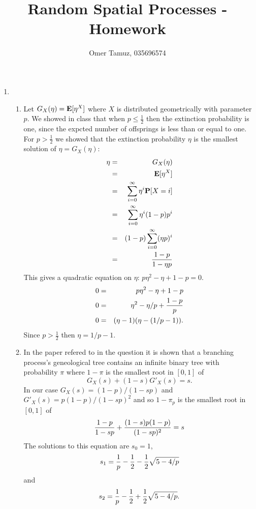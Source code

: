 \documentclass[11pt]{article} \usepackage{amssymb}
\newcommand{\E}{{\bf E}} \newcommand{\Cov}{{\bf Cov}}
\newcommand{\half}{{\textstyle \frac12}}
\begin{document}
\title{Random Spatial Processes - Homework}

 \author{Omer Tamuz, 035696574}
\maketitle


\begin{enumerate}
  \item
  \begin{enumerate}
  \item Let $G_X(\eta)=\E[\eta^X]$ where $X$ is distributed geometrically with
    parameter $p$. We showed in class that when $p \leq \half$ then the 
    extinction probability is one,
    since the expcted number of offsprings is less than or equal to one.
    For $p>\half$ we showed that the extinction probability $\eta$ is
    the smallest solution of $\eta=G_X(\eta)$:
    \begin{eqnarray*}
      \eta &=& G_X(\eta)
      \\ &=& \E[\eta^X]
      \\ &=& \sum_{i=0}^\infty \eta^i\P[X=i]
      \\ &=& \sum_{i=0}^\infty \eta^i(1-p)p^i
      \\ &=& (1-p)\sum_{i=0}^\infty (\eta p)^i
      \\ &=& {1-p \over 1 - \eta p}
    \end{eqnarray*}
    This gives a quadratic equation on $\eta$: $p\eta^2-\eta+1-p=0$.
    \begin{eqnarray*}
      0 &=& p\eta^2-\eta+1-p
      \\ 0 &=& \eta^2-\eta/p+{1-p \over p}
      \\ 0 &=& (\eta-1)(\eta-(1/p-1)).
    \end{eqnarray*}
    Since $p>\half$ then $\eta=1/p-1$.
  \item
    In the paper refered to in the question it is shown that a branching
    process's geneological tree contains an infinite binary tree with
    probability $\pi$ where $1-\pi$ is the smallest root in $[0,1]$ of
    $$G_X(s)+(1-s)G'_X(s)=s.$$
    In our case $G_X(s)=(1-p)/(1-sp)$ and $G'_X(s)=p(1-p)/(1-sp)^2$ 
    and so $1-\pi_p$ is the smallest root in $[0,1]$ of
    \begin{eqnarray*}
      {1-p \over 1-sp}+{(1-s)p(1-p)\over (1-sp)^2}=s
    \end{eqnarray*}
    The solutions to this equation are $s_0=1$,
    $$s_1={1\over p}-{1\over 2}-{1\over 2}\sqrt{5-4/p}$$
    and
    $$s_2={1\over p}-{1\over 2}+{1\over 2}\sqrt{5-4/p}.$$
    

\end{enumerate}
\end{enumerate}
\end{document}
